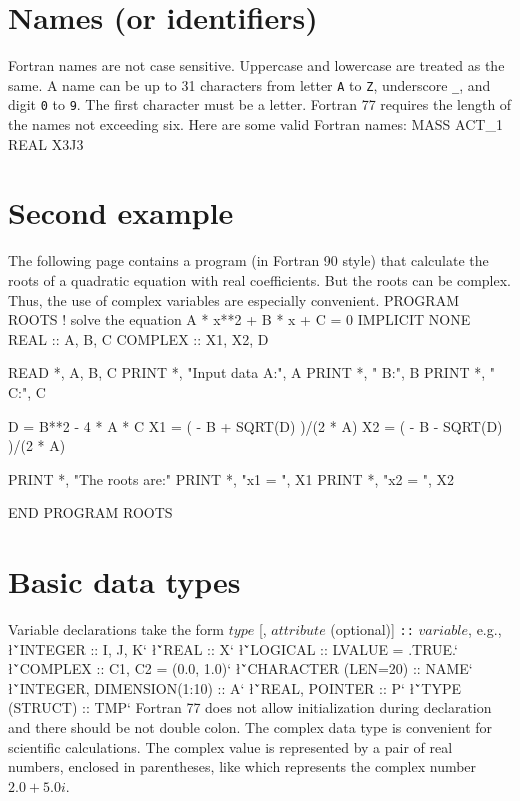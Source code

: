 {\section{Names (or identifiers)}
Fortran names are not case sensitive.  Uppercase and 
lowercase are treated as the same.  A name can be up to 31 characters from
letter {\tt A} to {\tt Z}, underscore {\tt \_}, and digit {\tt 0} to {\tt 9}.
The first character must be a letter.  Fortran 77 requires the length of the
names not exceeding six.  Here are some valid Fortran names:
\ttbg
MASS
ACT_1
REAL
X3J3
\tted

\section{Second example}
The following page contains a program (in Fortran 90 style) 
that calculate the roots of a 
quadratic equation with real coefficients.  But the roots can be complex.
Thus, the use of complex variables are especially convenient.
\ttbg
PROGRAM ROOTS
!  solve the equation   A * x**2 + B * x + C = 0
   IMPLICIT NONE
   REAL :: A, B, C
   COMPLEX :: X1, X2, D

   READ *, A, B, C
   PRINT *, "Input data A:", A
   PRINT *, "           B:", B
   PRINT *, "           C:", C

   D = B**2 - 4 * A * C
   X1 = ( - B + SQRT(D) )/(2 * A)
   X2 = ( - B - SQRT(D) )/(2 * A)

   PRINT *, "The roots are:"
   PRINT *, "x1 = ", X1
   PRINT *, "x2 = ", X2

END PROGRAM ROOTS
\tted

\vfill\eject
{}

\section{Basic data types}
Variable declarations take the form $type$ [, $attribute$ (optional)] 
{\tt ::} $variable$, e.g.,
\sms
\l{\v`INTEGER  :: I, J, K`}
\l{\v`REAL :: X`}
\l{\v`LOGICAL :: LVALUE = .TRUE.`}
\l{\v`COMPLEX :: C1, C2 = (0.0, 1.0)`}
\l{\v`CHARACTER (LEN=20) :: NAME`}
\l{\v`INTEGER, DIMENSION(1:10) :: A`}
\l{\v`REAL, POINTER :: P`}
\l{\v`TYPE (STRUCT) :: TMP`}
\sms
Fortran 77 does not allow initialization during declaration and
there should be not double colon.   The complex data type is convenient for 
scientific calculations.  The complex value is represented by a pair
of real numbers, enclosed in parentheses, like
\sms
{}
\sms
which represents the complex number $ 2.0 + 5.0 i$.

}
